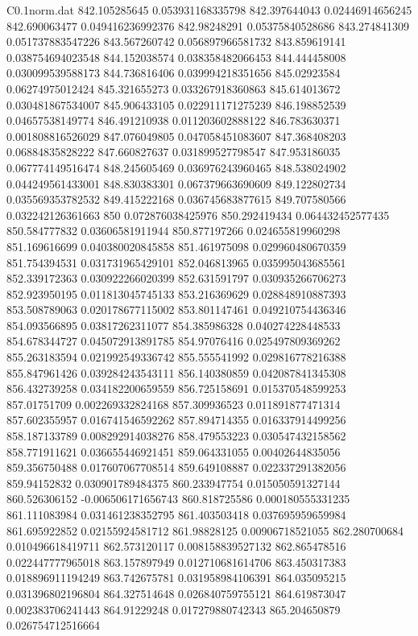 \begin{filecontents}{C0.1norm.dat}
842.105285645		0.053931168335798
842.397644043		0.02446914656245
842.690063477		0.049416236992376
842.98248291		0.05375840528686
843.274841309		0.051737883547226
843.567260742		0.056897966581732
843.859619141		0.038754694023548
844.152038574		0.038358482066453
844.444458008		0.030099539588173
844.736816406		0.039994218351656
845.02923584		0.06274975012424
845.321655273		0.033267918360863
845.614013672		0.030481867534007
845.906433105		0.022911171275239
846.198852539		0.04657538149774
846.491210938		0.011203602888122
846.783630371		0.001808816526029
847.076049805		0.047058451083607
847.368408203		0.06884835828222
847.660827637		0.031899527798547
847.953186035		0.067774149516474
848.245605469		0.036976243960465
848.538024902		0.044249561433001
848.830383301		0.067379663690609
849.122802734		0.035569353782532
849.415222168		0.036745683877615
849.707580566		0.032242126361663
850		0.072876038425976
850.292419434		0.064432452577435
850.584777832		0.03606581911944
850.877197266		0.024655819960298
851.169616699		0.040380020845858
851.461975098		0.029960480670359
851.754394531		0.031731965429101
852.046813965		0.035995043685561
852.339172363		0.030922266020399
852.631591797		0.030935266706273
852.923950195		0.011813045745133
853.216369629		0.028848910887393
853.508789063		0.020178677115002
853.801147461		0.049210754436346
854.093566895		0.03817262311077
854.385986328		0.040274228448533
854.678344727		0.045072913891785
854.97076416		0.025497809369262
855.263183594		0.021992549336742
855.555541992		0.029816778216388
855.847961426		0.039284243543111
856.140380859		0.042087841345308
856.432739258		0.034182200659559
856.725158691		0.015370548599253
857.01751709		0.002269332824168
857.309936523		0.011891877471314
857.602355957		0.016741546592262
857.894714355		0.016337914499256
858.187133789		0.008292914038276
858.479553223		0.030547432158562
858.771911621		0.036655446921451
859.064331055		0.00402644835056
859.356750488		0.017607067708514
859.649108887		0.022337291382056
859.94152832		0.030901789484375
860.233947754		0.015050591327144
860.526306152		-0.006506171656743
860.818725586		0.000180555331235
861.111083984		0.031461238352795
861.403503418		0.037695959659984
861.695922852		0.02155924581712
861.98828125		0.00906718521055
862.280700684		0.010496618419711
862.573120117		0.008158839527132
862.865478516		0.022447777965018
863.157897949		0.012710681614706
863.450317383		0.018896911194249
863.742675781		0.031958984106391
864.035095215		0.031396802196804
864.327514648		0.026840759755121
864.619873047		0.002383706241443
864.91229248		0.017279880742343
865.204650879		0.026754712516664

\end{filecontents}
